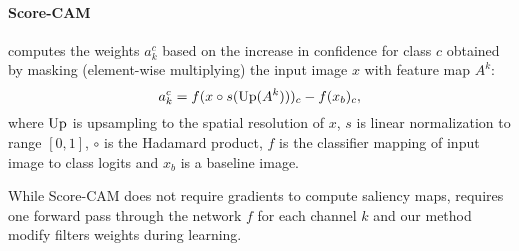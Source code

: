 


\paragraph{Score-CAM \cite{scorecam}}

computes the weights $a^c_k$ based on the increase in confidence \cite{gradcampp} for class $c$ obtained by masking (element-wise multiplying) the input image $x$ with feature map $A^k$:
\begin{equation}
	a^c_k = f(x \circ s(\operatorname{Up}(A^k)))_c - f(x_b)_c,
\label{eq:scam}
\end{equation}
where $\operatorname{Up}$ is upsampling to the spatial resolution of $x$, $s$ is linear normalization to range $[0,1]$, $\circ$ is the Hadamard product, $f$ is the classifier mapping of input image to class logits and $x_b$ is a baseline image.

While Score-CAM does not require gradients to compute saliency maps,  requires one forward pass through the network $f$ for each channel $k$ and our method modify filters weights during learning.
